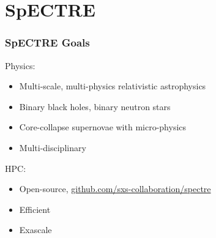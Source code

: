 \documentclass[svgnames,tikz,serif,ragged2e]{beamer}
\begin{document}
\makeatletter

\makeatother


\begin{frame}
  \titlepage{}
\end{frame}

\section{SpECTRE}


\begin{frame}
  \frametitle{SpECTRE Goals}
  Physics:
  \begin{itemize}
  \item Multi-scale, multi-physics relativistic astrophysics
  \item Binary black holes, binary neutron stars
  \item Core-collapse supernovae with micro-physics
  \item Multi-disciplinary
  \end{itemize}
  HPC:\@
  \begin{itemize}
  \item Open-source, \href{https://github.com/sxs-collaboration/spectre}
    {github.com/sxs-collaboration/spectre}
  \item Efficient
  \item Exascale
  \end{itemize}
\end{frame}
\end{document}
